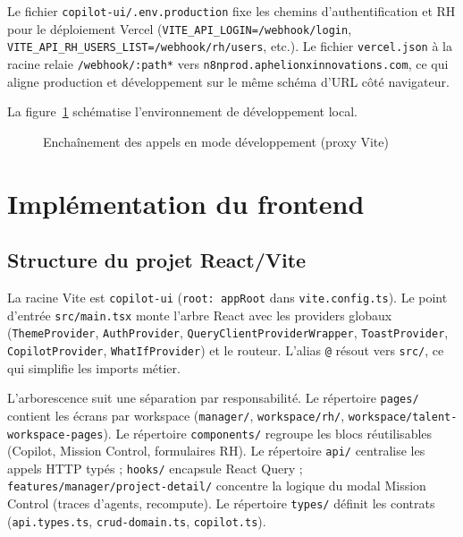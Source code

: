 Le fichier \texttt{copilot-ui/.env.production} fixe les chemins d'authentification et RH pour le déploiement Vercel (\texttt{VITE\_API\_LOGIN=/webhook/login}, \texttt{VITE\_API\_RH\_USERS\_LIST=/webhook/rh/users}, etc.). Le fichier \texttt{vercel.json} à la racine relaie \texttt{/webhook/:path*} vers \texttt{n8nprod.aphelionxinnovations.com}, ce qui aligne production et développement sur le même schéma d'URL côté navigateur.

La figure~\ref{fig:archi-dev-ch5} schématise l'environnement de développement local.

\begin{figure}[htbp]
\centering
{}
\caption{Enchaînement des appels en mode développement (proxy Vite)}
\label{fig:archi-dev-ch5}
\end{figure}

\section{Implémentation du frontend}

\subsection{Structure du projet React/Vite}

La racine Vite est \texttt{copilot-ui} (\texttt{root: appRoot} dans \texttt{vite.config.ts}). Le point d'entrée \texttt{src/main.tsx} monte l'arbre React avec les providers globaux (\texttt{ThemeProvider}, \texttt{AuthProvider}, \texttt{QueryClientProviderWrapper}, \texttt{ToastProvider}, \texttt{CopilotProvider}, \texttt{WhatIfProvider}) et le routeur. L'alias \texttt{@} résout vers \texttt{src/}, ce qui simplifie les imports métier.

L'arborescence suit une séparation par responsabilité. Le répertoire \texttt{pages/} contient les écrans par workspace (\texttt{manager/}, \texttt{workspace/rh/}, \texttt{workspace/talent-workspace-pages}). Le répertoire \texttt{components/} regroupe les blocs réutilisables (Copilot, Mission Control, formulaires RH). Le répertoire \texttt{api/} centralise les appels HTTP typés ; \texttt{hooks/} encapsule React Query ; \texttt{features/manager/project-detail/} concentre la logique du modal Mission Control (traces d'agents, recompute). Le répertoire \texttt{types/} définit les contrats (\texttt{api.types.ts}, \texttt{crud-domain.ts}, \texttt{copilot.ts}).

